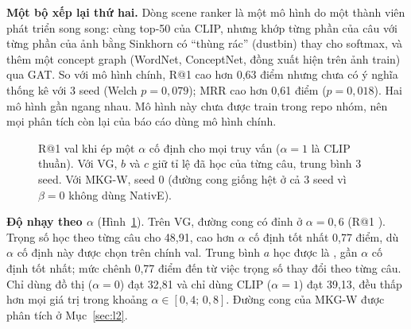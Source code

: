 \textbf{Một bộ xếp lại thứ hai.} Dòng scene ranker là một mô hình do một thành viên phát triển song song: cùng top-50 của
CLIP, nhưng khớp từng phần của câu với từng phần của ảnh bằng Sinkhorn có ``thùng rác'' (dustbin) thay cho softmax, và thêm
một concept graph (WordNet, ConceptNet, đồng xuất hiện trên ảnh train) qua GAT. So với mô hình chính, R@1 cao hơn 0,63 điểm
nhưng chưa có ý nghĩa thống kê với 3 seed (Welch $p = 0{,}079$); MRR cao hơn 0,61 điểm ($p = 0{,}018$). Hai mô hình gần
ngang nhau. Mô hình này chưa được train trong repo nhóm, nên mọi phân tích còn lại của báo cáo dùng mô hình chính.

\begin{figure}[t]
\centering
{}
\caption{R@1 val khi ép một $\alpha$ cố định cho mọi truy vấn ($\alpha=1$ là CLIP thuần). Với VG, $b$ và $c$ giữ tỉ lệ đã
học của từng câu, trung bình 3 seed. Với MKG-W, seed 0 (đường cong giống hệt ở cả 3 seed vì $\beta=0$ không dùng NativE).}
\label{fig:alpha}
\end{figure}

\textbf{Độ nhạy theo $\alpha$} (Hình~\ref{fig:alpha}). Trên VG, đường cong có đỉnh ở $\alpha = 0{,}6$ (R@1
). Trọng số học theo từng câu cho 48,91, cao hơn $\alpha$ cố định tốt nhất 0,77 điểm, dù $\alpha$ cố định
này được chọn trên chính val. Trung bình $a$ học được là , gần $\alpha$ cố định tốt nhất; mức chênh 0,77
điểm đến từ việc trọng số thay đổi theo từng câu. Chỉ dùng đồ thị ($\alpha = 0$) đạt 32,81 và chỉ dùng CLIP ($\alpha = 1$) đạt
39,13, đều thấp hơn mọi giá trị trong khoảng $\alpha \in [0{,}4;\,0{,}8]$. Đường cong của MKG-W được phân tích ở
Mục~\ref{sec:l2}.

